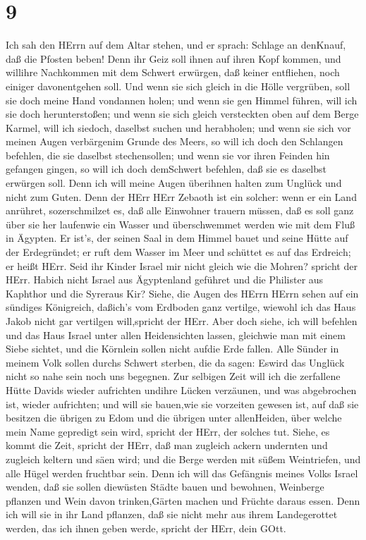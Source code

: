 \hypertarget{section-8}{%
\section{9}\label{section-8}}

 Ich sah den HErrn auf dem Altar stehen, und er sprach:
Schlage an denKnauf, daß die Pfosten beben! Denn ihr Geiz soll ihnen auf
ihren Kopf kommen, und willihre Nachkommen mit dem Schwert erwürgen, daß
keiner entfliehen, noch einiger davonentgehen soll.  Und
wenn sie sich gleich in die Hölle vergrüben, soll sie doch meine Hand
vondannen holen; und wenn sie gen Himmel führen, will ich sie doch
herunterstoßen;  und wenn sie sich gleich versteckten oben
auf dem Berge Karmel, will ich siedoch, daselbst suchen und herabholen;
und wenn sie sich vor meinen Augen verbärgenim Grunde des Meers, so will
ich doch den Schlangen befehlen, die sie daselbst stechensollen;
 und wenn sie vor ihren Feinden hin gefangen gingen, so will
ich doch demSchwert befehlen, daß sie es daselbst erwürgen soll. Denn
ich will meine Augen überihnen halten zum Unglück und nicht zum Guten.
 Denn der HErr HErr Zebaoth ist ein solcher: wenn er ein
Land anrühret, sozerschmilzet es, daß alle Einwohner trauern müssen, daß
es soll ganz über sie her laufenwie ein Wasser und überschwemmet werden
wie mit dem Fluß in Ägypten.  Er ist's, der seinen Saal in
dem Himmel bauet und seine Hütte auf der Erdegründet; er ruft dem Wasser
im Meer und schüttet es auf das Erdreich; er heißt HErr. 
Seid ihr Kinder Israel mir nicht gleich wie die Mohren? spricht der
HErr. Habich nicht Israel aus Ägyptenland geführet und die Philister aus
Kaphthor und die Syreraus Kir?  Siehe, die Augen des HErrn
HErrn sehen auf ein sündiges Königreich, daßich's vom Erdboden ganz
vertilge, wiewohl ich das Haus Jakob nicht gar vertilgen will,spricht
der HErr.  Aber doch siehe, ich will befehlen und das Haus
Israel unter allen Heidensichten lassen, gleichwie man mit einem Siebe
sichtet, und die Körnlein sollen nicht aufdie Erde fallen. 
Alle Sünder in meinem Volk sollen durchs Schwert sterben, die da sagen:
Eswird das Unglück nicht so nahe sein noch uns begegnen. 
Zur selbigen Zeit will ich die zerfallene Hütte Davids wieder aufrichten
undihre Lücken verzäunen, und was abgebrochen ist, wieder aufrichten;
und will sie bauen,wie sie vorzeiten gewesen ist,  auf daß
sie besitzen die übrigen zu Edom und die übrigen unter allenHeiden, über
welche mein Name gepredigt sein wird, spricht der HErr, der solches tut.
 Siehe, es kommt die Zeit, spricht der HErr, daß man
zugleich ackern undernten und zugleich keltern und säen wird; und die
Berge werden mit süßem Weintriefen, und alle Hügel werden fruchtbar
sein.  Denn ich will das Gefängnis meines Volks Israel
wenden, daß sie sollen diewüsten Städte bauen und bewohnen, Weinberge
pflanzen und Wein davon trinken,Gärten machen und Früchte daraus essen.
 Denn ich will sie in ihr Land pflanzen, daß sie nicht mehr
aus ihrem Landegerottet werden, das ich ihnen geben werde, spricht der
HErr, dein GOtt.
